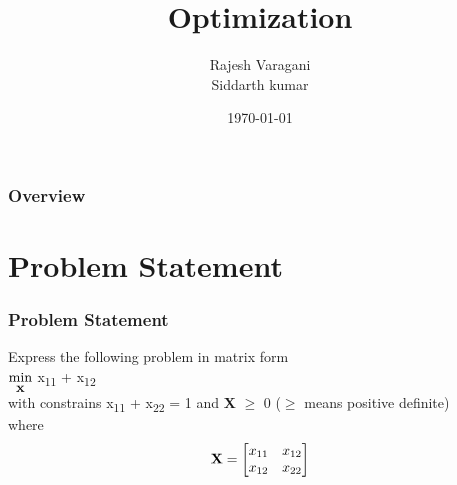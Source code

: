 \documentclass{beamer}
\title[Short title]{Optimization } %
\author{Rajesh Varagani \\ Siddarth kumar} %
\institute[IITH] %
{
IIT Hyderabad \\ %
\medskip
\text{EE15BTECH11035,EE15BTECH11032} %
}
\date{\today} %
\begin{document}
\begin{frame}
\titlepage %
\end{frame}

\begin{frame}
\frametitle{Overview} %
\tableofcontents %
\end{frame}


\section{Problem Statement} %


\begin{frame}
\frametitle{Problem Statement}
Express the following problem in matrix form \bigbreak
\\
\hspace{2cm}  \(\stackunder{min}{\textbf{x}}\) x\textsubscript{11} + x\textsubscript{12} \\

with constrains\hspace{2cm} x\textsubscript{11} + x\textsubscript{22} = 1 and \textbf{X} $\geq$ 0 ($\geq$ means positive definite) \\
where  \[
\textbf{X}=
  \begin{bmatrix}
    x\textsubscript{11} & x\textsubscript{12}\\
    x\textsubscript{12}  & x\textsubscript{22}
  \end{bmatrix}
\]


\end{frame}
\end{document}
